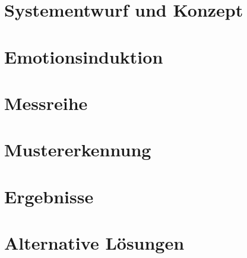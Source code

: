 

\section{Systementwurf und Konzept} \label{systementwurf-4}



%


\newpage
\section{Emotionsinduktion} \label{emotionsinduktion-4}



\newpage
\section{Messreihe} \label{messreihe-4}



\newpage
\section{Mustererkennung} \label{mustererkennung-4}


\section{Ergebnisse} \label{ergenisse-4}


\newpage
\section{Alternative L{\"o}sungen} \label{alternativen-4}

